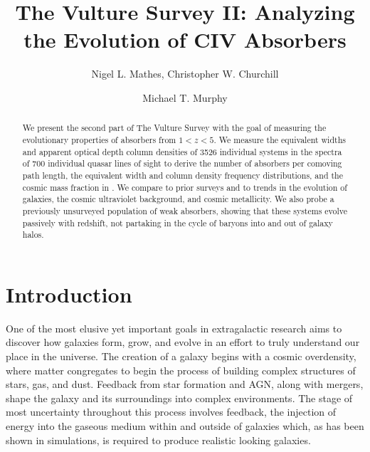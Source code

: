 \documentclass[linenumbers,twocolumn]{aastex61}
\begin{document}
\title{The Vulture Survey II: Analyzing the Evolution of CIV Absorbers}

\author{Nigel L. Mathes, Christopher W. Churchill}

\author{Michael T. Murphy}

\begin{abstract}
We present the second part of The Vulture Survey with the goal of measuring the evolutionary properties of {\CIV} absorbers from $1 < z < 5$. We measure the equivalent widths and apparent optical depth column densities of 3526 individual systems in the spectra of 700 individual quasar lines of sight to derive the number of absorbers per comoving path length, the equivalent width and column density frequency distributions, and the cosmic mass fraction in {\CIV}. We compare to prior surveys and to trends in the evolution of galaxies, the cosmic ultraviolet background, and cosmic metallicity. We also probe a previously unsurveyed population of weak {\CIV} absorbers, showing that these systems evolve passively with redshift, not partaking in the cycle of baryons into and out of galaxy halos.

\end{abstract}



\section{Introduction}
\label{sec:intro}

One of the most elusive yet important goals in extragalactic research aims to discover how galaxies form, grow, and evolve in an effort to truly understand our place in the universe. The creation of a galaxy begins with a cosmic overdensity, where matter congregates to begin the process of building complex structures of stars, gas, and dust. Feedback from star formation and AGN, along with mergers, shape the galaxy and its surroundings into complex environments. The stage of most uncertainty throughout this process involves feedback, the injection of energy into the gaseous medium within and outside of galaxies which, as has been shown in simulations, is required to produce realistic looking galaxies.
\end{document}
